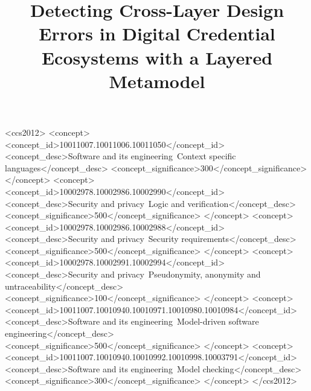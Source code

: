 \documentclass[sigconf,anonymous,review]{acmart}
\begin{document}
\title[Detecting Cross-Layer Design Errors in VC Ecosystems]{Detecting Cross-Layer Design Errors in Digital Credential Ecosystems with a Layered Metamodel}




\begin{CCSXML}
<ccs2012>
   <concept>
       <concept_id>10011007.10011006.10011050</concept_id>
       <concept_desc>Software and its engineering~Context specific languages</concept_desc>
       <concept_significance>300</concept_significance>
       </concept>
   <concept>
       <concept_id>10002978.10002986.10002990</concept_id>
       <concept_desc>Security and privacy~Logic and verification</concept_desc>
       <concept_significance>500</concept_significance>
       </concept>
   <concept>
       <concept_id>10002978.10002986.10002988</concept_id>
       <concept_desc>Security and privacy~Security requirements</concept_desc>
       <concept_significance>500</concept_significance>
       </concept>
   <concept>
       <concept_id>10002978.10002991.10002994</concept_id>
       <concept_desc>Security and privacy~Pseudonymity, anonymity and untraceability</concept_desc>
       <concept_significance>100</concept_significance>
       </concept>
   <concept>
       <concept_id>10011007.10010940.10010971.10010980.10010984</concept_id>
       <concept_desc>Software and its engineering~Model-driven software engineering</concept_desc>
       <concept_significance>500</concept_significance>
       </concept>
   <concept>
       <concept_id>10011007.10010940.10010992.10010998.10003791</concept_id>
       <concept_desc>Software and its engineering~Model checking</concept_desc>
       <concept_significance>300</concept_significance>
       </concept>
 </ccs2012>
\end{CCSXML}



\end{document}
